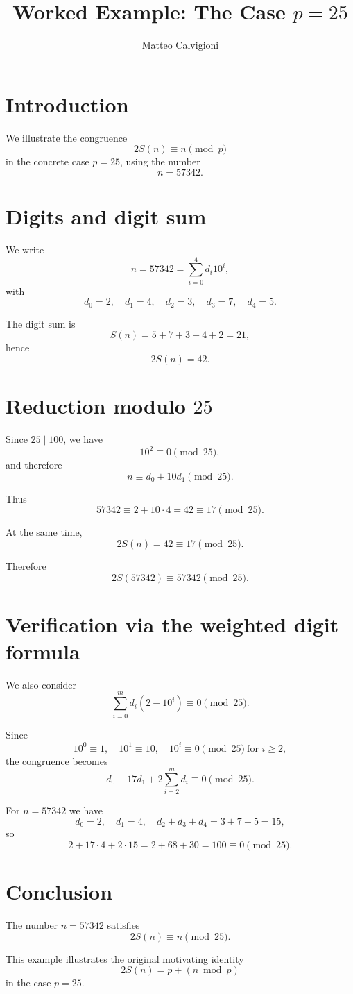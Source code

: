 \documentclass{article}
\title{Worked Example: The Case $p=25$}
\author{Matteo Calvigioni}
\date{}
\begin{document}
\maketitle

\section*{Introduction}

We illustrate the congruence
\[
2S(n)\equiv n \pmod{p}
\]
in the concrete case $p=25$, using the number
\[
n=57342.
\]

\section*{Digits and digit sum}

We write
\[
n=57342 = \sum_{i=0}^4 d_i 10^i,
\]
with
\[
d_0=2,\quad d_1=4,\quad d_2=3,\quad d_3=7,\quad d_4=5.
\]

The digit sum is
\[
S(n)=5+7+3+4+2=21,
\]
hence
\[
2S(n)=42.
\]

\section*{Reduction modulo $25$}

Since $25 \mid 100$, we have
\[
10^2 \equiv 0 \pmod{25},
\]
and therefore
\[
n \equiv d_0 + 10d_1 \pmod{25}.
\]

Thus
\[
57342 \equiv 2 + 10\cdot 4 = 42 \equiv 17 \pmod{25}.
\]

At the same time,
\[
2S(n)=42 \equiv 17 \pmod{25}.
\]

Therefore
\[
2S(57342)\equiv 57342 \pmod{25}.
\]

\section*{Verification via the weighted digit formula}

We also consider
\[
\sum_{i=0}^m d_i(2-10^i)\equiv 0 \pmod{25}.
\]

Since
\[
10^0\equiv 1,\quad 10^1\equiv 10,\quad 10^i\equiv 0 \pmod{25} \ \text{for } i\ge 2,
\]
the congruence becomes
\[
d_0 + 17d_1 + 2\sum_{i=2}^m d_i \equiv 0 \pmod{25}.
\]

For $n=57342$ we have
\[
d_0=2,\quad d_1=4,\quad d_2+d_3+d_4=3+7+5=15,
\]
so
\[
2 + 17\cdot 4 + 2\cdot 15 = 2 + 68 + 30 = 100 \equiv 0 \pmod{25}.
\]

\section*{Conclusion}

The number $n=57342$ satisfies
\[
2S(n)\equiv n \pmod{25}.
\]

This example illustrates the original motivating identity
\[
2S(n) = p + (n \bmod p)
\]
in the case $p=25$.
\end{document}
